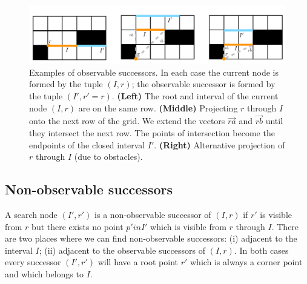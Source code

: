 \begin{figure}[tb]
\center
		   \includegraphics[width=\columnwidth]
			{images/observable.pdf}
	\vspace{-3pt}
\caption{\small
Examples of observable successors. In each case the current node is formed by the tuple $(I, r)$; the observable
successor is formed by the tuple $(I', r' = r)$. \textbf{(Left)} The root and interval of the current node $(I, r)$ are on
the same row. \textbf{(Middle)} Projecting $r$ through $I$ onto the next row of the grid. We extend the vectors $\vec{ra}$ and $\vec{rb}$
until they intersect the next row. The points of intersection become the endpoints of the closed interval $I'$. 
\textbf{(Right)} Alternative projection of $r$ through $I$ (due to obstacles).
}
\label{fig::observable}
\end{figure}

\subsection{Non-observable successors}
A search node $(I', r')$ is a non-observable successor of $(I, r)$ if $r'$ is visible from $r$ but
there exists no point $p' in I'$ which is visible from $r$ through $I$. There are two places
where we can find non-observable successors: (i) adjacent to the interval $I$; (ii) adjacent to the 
observable successors of $(I, r)$. In both cases every successor $(I', r')$ will have a root point
$r'$ which is always a corner point and which belongs to $I$.

